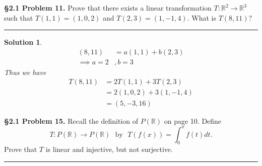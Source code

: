 \documentclass[leqno]{article}
\theoremstyle{nonumberplain}
\newtheorem{solution}{Solution}
\begin{document}
\pagebreak




\noindent\textbf{\S 2.1 Problem 11.} Prove that there exists a linear transformation $T\colon \mathbb{R}^2 \to \mathbb{R}^3$ such that $T(1,1)=(1,0,2)$ and $T(2,3)=(1,-1,4)$. What is $T(8,11)$?

\noindent\rule[0.5ex]{\linewidth}{1pt}

\begin{solution}
\begin{align*}
(8,11)&=a(1,1)+b(2,3)\\
\implies a=2&,b=3
\end{align*}
Thus we have
\begin{align*}
T(8,11)&=2T(1,1)+3T(2,3)\\
&=2(1,0,2)+3(1,-1,4)\\
&=(5,-3,16)
\end{align*}
\end{solution}
\pagebreak




\noindent\textbf{\S 2.1 Problem 15.} Recall the definition of $P(\mathbb{R})$ on page 10. Define
\[T\colon P(\mathbb{R})\to P(\mathbb{R}) \textrm{~ by ~} T(f(x))=\int_0^x f(t)dt.
\]
Prove that $T$ is linear and injective, but not surjective.

\noindent\rule[0.5ex]{\linewidth}{1pt}
\end{document}
